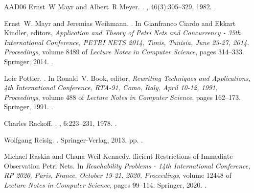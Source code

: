 \documentclass[11pt,a4paper]{amsart}
\theoremstyle{plain}
\theoremstyle{definition}
\theoremstyle{defC}
\theoremstyle{thmC}
\begin{document}
\begin{thebibliography}{AAD{\etalchar{+}}06}
Ernst~W Mayr and Albert~R Meyer.
.
, 46(3):305--329, 1982.
\newblock \href {https://doi.org/10.1016/0001-8708(82)90048-2}
  {}.

Ernst~W. Mayr and Jeremias Weihmann.
.
\newblock In Gianfranco Ciardo and Ekkart Kindler, editors, {\em Application
  and Theory of Petri Nets and Concurrency - 35th International Conference,
  {PETRI} {NETS} 2014, Tunis, Tunisia, June 23-27, 2014. Proceedings}, volume
  8489 of {\em Lecture Notes in Computer Science}, pages 314--333. Springer,
  2014.
\newblock \href {https://doi.org/10.1007/978-3-319-07734-5\_17}
  {}.

Loic Pottier.
.
\newblock In Ronald~V. Book, editor, {\em Rewriting Techniques and
  Applications, 4th International Conference, RTA-91, Como, Italy, April 10-12,
  1991, Proceedings}, volume 488 of {\em Lecture Notes in Computer Science},
  pages 162--173. Springer, 1991.
\newblock \href {https://doi.org/10.1007/3-540-53904-2\_94}
  {}.

Charles Rackoff.
.
, 6:223--231, 1978.
\newblock \href {https://doi.org/10.1016/0304-3975(78)90036-1}
  {}.

Wolfgang Reisig.
.
\newblock Springer-Verlag, 2013.
 pp.
\newblock \href {https://doi.org/10.1007/978-3-642-33278-4}
  {}.

Michael Raskin and Chana Weil{-}Kennedy.
fficient {R}estrictions of {I}mmediate {O}bservation {P}etri
  {N}ets.
\newblock In {\em Reachability Problems - 14th International Conference, {RP}
  2020, Paris, France, October 19-21, 2020, Proceedings}, volume 12448 of {\em
  Lecture Notes in Computer Science}, pages 99--114. Springer, 2020.
\newblock \href {https://doi.org/10.1007/978-3-030-61739-4\_7}
  {}.


\end{thebibliography}
\end{document}

